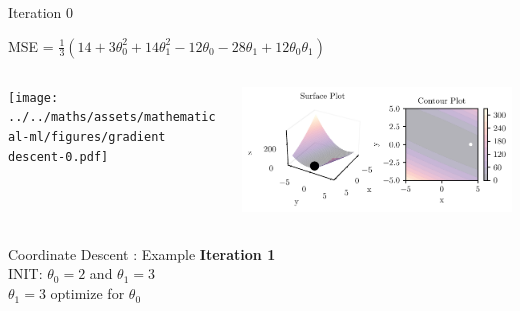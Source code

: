 \documentclass{beamer}
\begin{document}
\begin{frame}{Iteration 0}

MSE = $\frac{1}{3}(14+3\theta_{0}^{2}+14\theta_{1}^{2}-12\theta_{0}-28\theta_{1}+12\theta_{0}\theta_{1})$\\

\begin{columns}
\begin{column}{0.6\textwidth}
\begin{adjustbox}{max totalsize={\textwidth},center}
\texttt{[image: ../../maths/assets/mathematical-ml/figures/gradient descent-0.pdf]}
\end{adjustbox}

\end{column}
\begin{column}{0.5\textwidth}
\begin{adjustbox}{max totalsize={\textwidth},center}
\includegraphics[width=\textwidth]{../../maths/assets/mathematical-ml/figures/contour-linreg-0.pdf}
\end{adjustbox}
\end{column}
\end{columns}




\end{frame}

\begin{frame}{Coordinate Descent : Example}
\textbf{Iteration 1}\\
\vspace{0.5cm}
INIT: $\theta_{0} = 2$ and  $\theta_{1}  = 3$\\

\vspace{0.5cm}
$\theta_1 = 3$ optimize for $\theta_{0}$\\ 


\end{frame}
\end{document}
